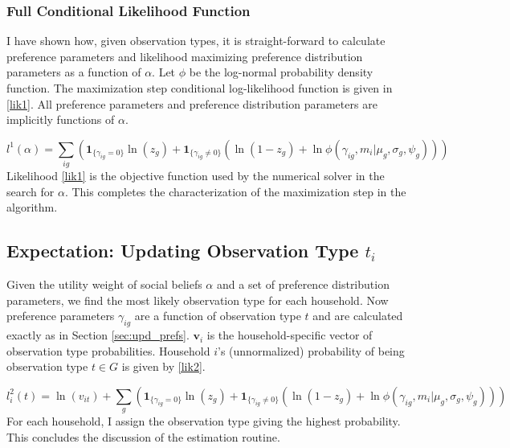 \documentclass[12pt]{article}
\begin{document}
\subsubsection{Full Conditional Likelihood Function}

I have shown how, given observation types, it is straight-forward to calculate preference parameters and likelihood maximizing preference distribution parameters as a function of $\alpha$.  Let $\phi$ be the log-normal probability density function.   The maximization step conditional log-likelihood function is given in \eqref{lik1}.  All preference parameters and preference distribution parameters are implicitly functions of $\alpha$.

\begin{equation}
	\label{lik1}
    l^1(\alpha) = \sum_{ig} \left(\mathbf{1}_{\{\gamma_{ig} = 0\}}\ln\left(z_g\right) + \mathbf{1}_{\{\gamma_{ig} \neq 0\}} \left(\ln\left(1 - z_g\right)+\ln \phi(\gamma_{ig},m_i|\mu_g,\sigma_g,\psi_g)\right)\right)
\end{equation}
Likelihood \eqref{lik1} is the objective function used by the numerical solver in the search for $\alpha$.  This completes the characterization of the maximization step in the algorithm.

\subsection{Expectation: Updating Observation Type $t_i$} 

Given the utility weight of social beliefs $\alpha$ and a set of preference distribution parameters, we find the most likely observation type for each household. Now preference parameters $\gamma_{ig}$ are a function of observation type $t$ and are calculated exactly as in Section \ref{sec:upd_prefs}. $\mathbf{v}_i$ is the household-specific vector of observation type probabilities.  Household $i$'s (unnormalized) probability of being observation type $t \in G$ is given by \eqref{lik2}.

\begin{equation}
    \label{lik2}
    l_i^2(t) = \ln(v_{it}) + \sum_{g} \left(\mathbf{1}_{\{\gamma_{ig} = 0\}}\ln\left(z_g\right) + \mathbf{1}_{\{\gamma_{ig} \neq 0\}} \left(\ln\left(1-z_g\right)+\ln \phi(\gamma_{ig}, m_i|\mu_g,\sigma_g,\psi_g)\right)\right)
\end{equation}
For each household, I assign the observation type giving the highest probability.  This concludes the discussion of the estimation routine.
\end{document}

